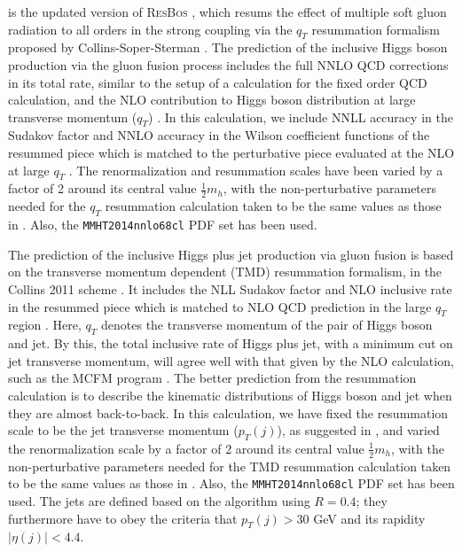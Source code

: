 \subsubsection{\Resbos}
\label{sec:hjetscomp:tools:ares:resbos}

\Resbos is the updated version of \textsc{ResBos} \cite{Balazs:1997xd}, 
which resums the effect of multiple soft gluon radiation to all orders 
in the strong coupling via the $q_T$ resummation formalism proposed by 
Collins-Soper-Sterman \cite{Collins:1984kg}. The \Resbos prediction 
of the inclusive Higgs boson production via the gluon fusion process 
includes the full NNLO QCD corrections in its total rate, similar to 
the setup of a \HNNLO calculation for the fixed order QCD calculation, and 
the NLO contribution to Higgs boson distribution at large transverse 
momentum ($q_T$) \cite{Glosser:2002gm}. In this calculation, we include 
NNLL accuracy in the Sudakov factor and NNLO accuracy in the Wilson coefficient functions 
of the resummed piece which is matched to the perturbative piece 
evaluated at the NLO at large $q_T$ \cite{Wang:2012xs}. The 
renormalization and resummation scales have been varied by a factor 
of 2 around its central value $\tfrac{1}{2}m_h$, with the 
non-perturbative parameters needed for the $q_T$ resummation calculation 
taken to be the same values as those in \cite{Wang:2012xs}. Also, 
the \texttt{MMHT2014nnlo68cl} PDF set has been used. 

The \Resbos prediction of the inclusive Higgs plus jet production via 
gluon fusion is based on the transverse momentum dependent (TMD) 
resummation formalism, in the Collins 2011 scheme \cite{Collins:2011zzd}.
It includes the NLL Sudakov factor and NLO inclusive rate in the 
resummed piece which is matched to NLO QCD prediction in the large 
$q_T$ region \cite{Sun:2016kkh}. Here, $q_T$ denotes the transverse 
momentum of the pair of Higgs boson and jet. By this, the total 
inclusive rate of Higgs plus jet, with a minimum cut on jet transverse 
momentum, will agree well with that given by the NLO calculation, such 
as the MCFM program \cite{Campbell:2010ff}. The better prediction from 
the resummation calculation is to describe the kinematic distributions 
of Higgs boson and jet when they are almost back-to-back. In this 
calculation, we have fixed the resummation scale to be the jet 
transverse momentum ($p_T(j)$), as suggested in \cite{Sun:2016kkh}, 
and varied the renormalization scale by a factor of 2 around its 
central value $\tfrac{1}{2}m_h$, with the non-perturbative parameters 
needed for the TMD resummation calculation taken to be the same values 
as those in \cite{Sun:2016kkh}. Also, the \texttt{MMHT2014nnlo68cl} PDF 
set has been used. The jets are defined based on the \antikt algorithm 
using $R = 0.4$; they furthermore have to obey the criteria that 
$p_T(j) > 30$ GeV and its rapidity $|\eta(j)| < 4.4$.

